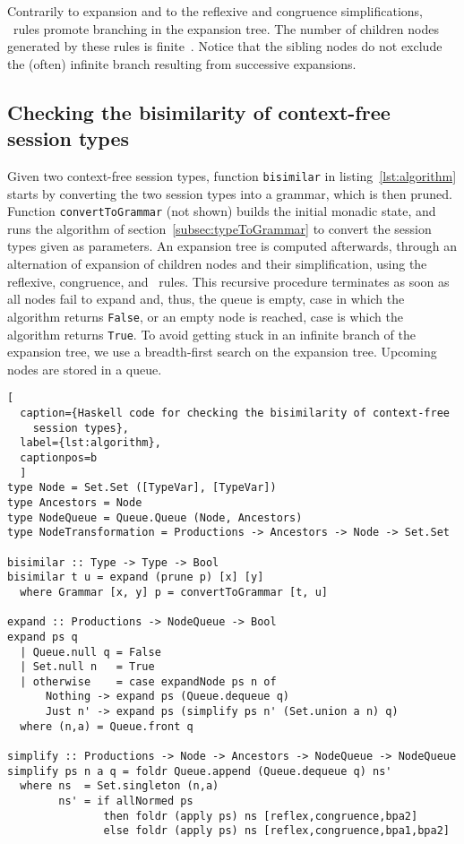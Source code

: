 Contrarily to expansion and to the reflexive and congruence
simplifications, \BPA\ rules promote branching in the expansion
tree. The number of children nodes generated by these rules is
finite~\cite{DBLP:journals/iandc/ChristensenHS95}.
%
Notice that the sibling nodes do not exclude the (often) infinite
branch resulting from successive expansions.

\subsection{Checking the bisimilarity of context-free session types}


Given two context-free session types, function \lstinline|bisimilar|
in listing~\ref{lst:algorithm} starts by converting the two session
types into a grammar, which is then pruned. Function
\lstinline|convertToGrammar| (not shown) builds the initial monadic
state, and runs the algorithm of section~\ref{subsec:typeToGrammar} to
convert the session types given as parameters.
%
An expansion tree is computed afterwards, through an alternation of
expansion of children nodes and their simplification, using the
reflexive, congruence, and \BPA\ rules. This recursive procedure
terminates as soon as all nodes fail to expand and, thus, the queue is
empty, case in which the algorithm returns \lstinline|False|, or an
empty node is reached, case is which the algorithm returns
\lstinline|True|.
%
To avoid getting stuck in an infinite branch of the expansion tree, we
use a breadth-first search on the expansion tree. Upcoming nodes are
stored in a queue.

\begin{lstlisting}[
  caption={Haskell code for checking the bisimilarity of context-free
    session types},
  label={lst:algorithm},
  captionpos=b
  ]
type Node = Set.Set ([TypeVar], [TypeVar])
type Ancestors = Node
type NodeQueue = Queue.Queue (Node, Ancestors)
type NodeTransformation = Productions -> Ancestors -> Node -> Set.Set

bisimilar :: Type -> Type -> Bool
bisimilar t u = expand (prune p) [x] [y]
  where Grammar [x, y] p = convertToGrammar [t, u]

expand :: Productions -> NodeQueue -> Bool
expand ps q
  | Queue.null q = False 
  | Set.null n   = True
  | otherwise    = case expandNode ps n of
      Nothing -> expand ps (Queue.dequeue q)
      Just n' -> expand ps (simplify ps n' (Set.union a n) q)
  where (n,a) = Queue.front q

simplify :: Productions -> Node -> Ancestors -> NodeQueue -> NodeQueue
simplify ps n a q = foldr Queue.append (Queue.dequeue q) ns'
  where ns  = Set.singleton (n,a)
        ns' = if allNormed ps
               then foldr (apply ps) ns [reflex,congruence,bpa2]
               else foldr (apply ps) ns [reflex,congruence,bpa1,bpa2]
\end{lstlisting}

